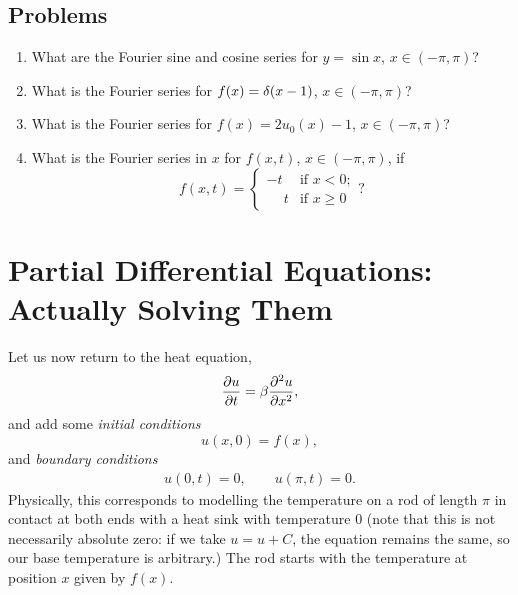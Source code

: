 \documentclass[10pt,driverfallback=hypertex]{report}
\newcounter{small}
\begin{document}

\newpage
\section{Problems}

\begin{enumerate}
  \item
    What are the Fourier sine and cosine series for
    $y=\sin x$, $x \in (-\pi,\pi)$?
  \item
    What is the Fourier series for $ f(x) = \delta(x-1)$, $x \in (-\pi,\pi)$?
  \item
    What is the Fourier series for $ f(x) = 2 u_0(x)-1 $, $x \in (-\pi,\pi)$?

  \item What is the Fourier series in $x$ for $f(x,t)$, $x \in (-\pi,\pi)$, if
    \begin{dmath*}[compact]
      f(x,t) =
      \left\{ \begin{array}{ll}
        -t           & \mbox{if $x < 0$};\\
        \phantom{-}t & \mbox{if $x \geq 0$}
      \end{array} \right. ?
    \end{dmath*}

\end{enumerate}


\chapter{Partial Differential Equations: Actually Solving Them}

Let us now return to the heat equation,
\begin{eqnarray}
  \label{heateq}
  \frac{\partial u}{\partial t} = \beta \frac{\partial^2 u}{\partial x^2},
\end{eqnarray}
and add some \emph{initial conditions}
\begin{dmath*}
  u(x,0)=f(x),
\end{dmath*}
and \emph{boundary conditions}
\begin{eqnarray}
  \label{homdibc}
  u(0,t)=0, \qquad u(\pi,t)=0.
\end{eqnarray}
Physically, this corresponds to modelling the temperature on a rod of
length $\pi$ in contact at both ends with a heat sink with temperature
$0$ (note that this is not necessarily absolute zero: if we take
$u=u+C$, the equation remains the same, so our base temperature is
arbitrary.) The rod starts with the temperature at position $x$ given
by $f(x)$.
\end{document}
